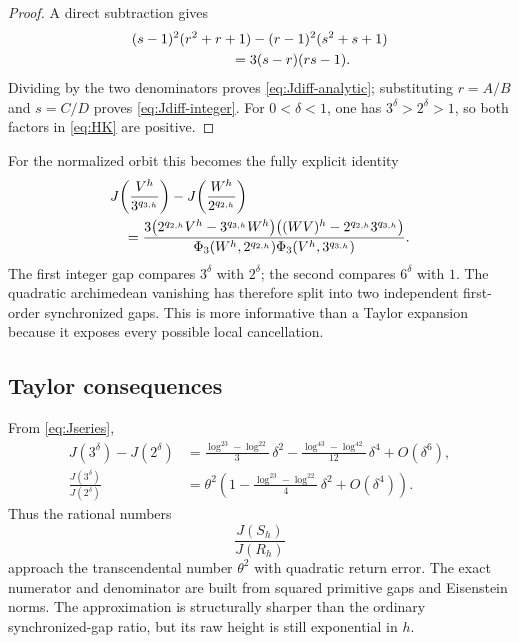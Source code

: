 \documentclass[11pt]{article}
\theoremstyle{definition}
\theoremstyle{remark}
\begin{document}
\begin{proof}
A direct subtraction gives
\begin{align*}
 &(s-1)^2(r^2+r+1)-(r-1)^2(s^2+s+1)\\
 &\hspace{25mm}=3(s-r)(rs-1).
\end{align*}
Dividing by the two denominators proves \eqref{eq:Jdiff-analytic}; substituting $r=A/B$ and $s=C/D$ proves \eqref{eq:Jdiff-integer}.  For $0<\delta<1$, one has $3^\delta>2^\delta>1$, so both factors in \eqref{eq:HK} are positive.
\end{proof}

For the normalized orbit this becomes the fully explicit identity
\begin{align}
 &J\!\left(\frac{V^h}{3^{q_{3,h}}}\right)
 -J\!\left(\frac{W^h}{2^{q_{2,h}}}\right)\notag\\
 &\quad=
 \frac{3\bigl(2^{q_{2,h}}V^h-3^{q_{3,h}}W^h\bigr)
 \bigl((WV)^h-2^{q_{2,h}}3^{q_{3,h}}\bigr)}
 {\Phi_3(W^h,2^{q_{2,h}})\Phi_3(V^h,3^{q_{3,h}})}.
 \label{eq:orbit-two-gap}
\end{align}
The first integer gap compares $3^\delta$ with $2^\delta$; the second compares $6^\delta$ with $1$.  The quadratic archimedean vanishing has therefore split into two independent first-order synchronized gaps.  This is more informative than a Taylor expansion because it exposes every possible local cancellation.

\subsection{Taylor consequences}

From \eqref{eq:Jseries},
\begin{align}
 J(3^\delta)-J(2^\delta)
 &=\frac{\log^23-\log^22}{3}\,\delta^2
 -\frac{\log^43-\log^42}{12}\,\delta^4
 +O(\delta^6),\label{eq:Jdiff-series}\\
 \frac{J(3^\delta)}{J(2^\delta)}
 &=\theta^2\left(
 1-\frac{\log^23-\log^22}{4}\,\delta^2
 +O(\delta^4)
 \right).
 \label{eq:Jratio-series}
\end{align}
Thus the rational numbers
\begin{equation}\label{eq:theta2-approximants}
 \frac{J(S_h)}{J(R_h)}
\end{equation}
approach the transcendental number $\theta^2$ with quadratic return error.  The exact numerator and denominator are built from squared primitive gaps and Eisenstein norms.  The approximation is structurally sharper than the ordinary synchronized-gap ratio, but its raw height is still exponential in $h$.
\end{document}
